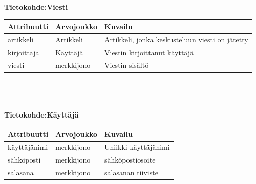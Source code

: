\documentclass[12pt]{article}
\begin{document}
        \textbf{Tietokohde:Viesti} \\
        \begin{tabular}{|p{8em}|p{8em}|p{13em}|} \hline
            \textbf{Attribuutti} & \textbf{Arvojoukko} & \textbf{Kuvailu} \\ \hline
                    artikkeli
                &   Artikkeli
                &   Artikkeli, jonka keskusteluun viesti on jätetty
            \\ \hline
                    kirjoittaja
                &   Käyttäjä
                &   Viestin kirjoittanut käyttäjä
            \\ \hline
                    viesti
                &   merkkijono
                &   Viestin sisältö
            \\ \hline
        \end{tabular} \\ \\ \\


        \textbf{Tietokohde:Käyttäjä} \\
        \begin{tabular}{|p{8em}|p{8em}|p{13em}|} \hline
            \textbf{Attribuutti} & \textbf{Arvojoukko} & \textbf{Kuvailu} \\ \hline
                    käyttäjänimi
                &   merkkijono
                &   Uniikki käyttäjänimi
            \\ \hline
                    sähköposti
                &   merkkijono
                &   sähköpostiosoite
            \\ \hline
                    salasana
                &   merkkijono
                &   salasanan tiiviste
            \\ \hline
        \end{tabular}
  \newpage
\end{document}
